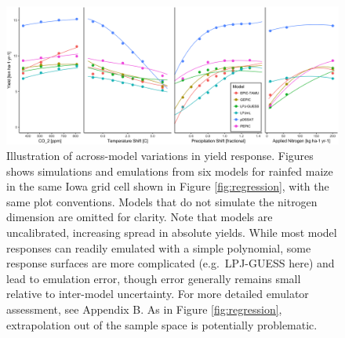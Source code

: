 \documentclass[esd, manuscript]{copernicus} %
\begin{document}
\begin{figure}[ht]
\centering
    \includegraphics[width=16cm]{figures/regression_model.png}
    \caption{Illustration of across-model variations in yield response. Figures shows simulations and emulations from six models for rainfed maize in the same Iowa grid cell shown in Figure \ref{fig:regression}, with the same plot conventions. Models that do not simulate the nitrogen dimension are omitted for clarity. Note that models are uncalibrated, increasing spread in absolute yields. While most model responses can readily emulated with a simple polynomial, some response surfaces are more complicated (e.g.\  LPJ-GUESS here) and lead to emulation error, though error generally remains small relative to inter-model uncertainty. For more detailed emulator assessment, see Appendix B. As in Figure \ref{fig:regression}, extrapolation out of the sample space is potentially problematic.}
   \label{fig:regression_iowa}
\end{figure}
\end{document}
